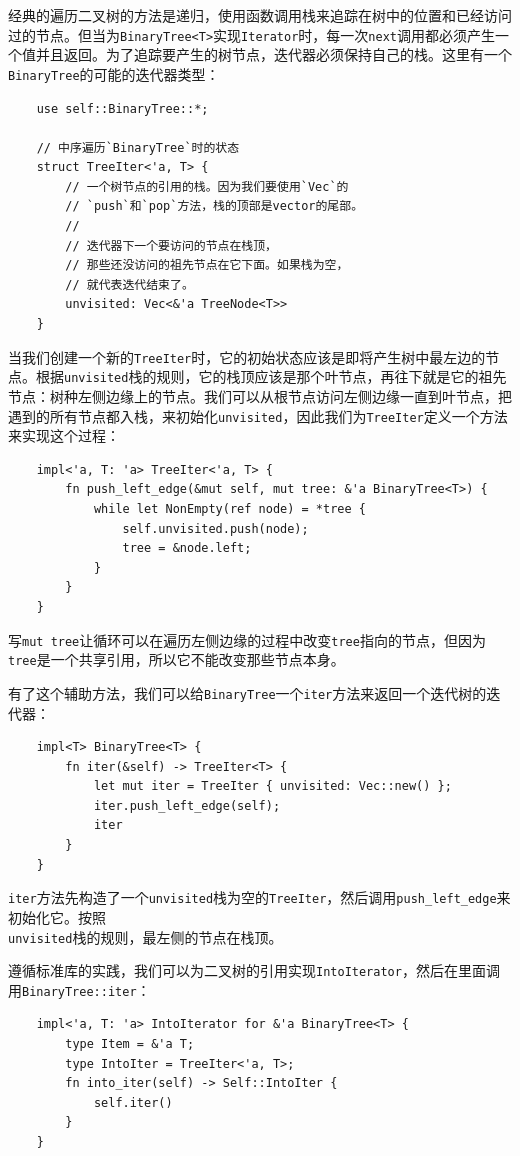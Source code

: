 经典的遍历二叉树的方法是递归，使用函数调用栈来追踪在树中的位置和已经访问过的节点。但当为\texttt{BinaryTree<T>}实现\texttt{Iterator}时，每一次\texttt{next}调用都必须产生一个值并且返回。为了追踪要产生的树节点，迭代器必须保持自己的栈。这里有一个\texttt{BinaryTree}的可能的迭代器类型：
\begin{verbatim}
    use self::BinaryTree::*;

    // 中序遍历`BinaryTree`时的状态
    struct TreeIter<'a, T> {
        // 一个树节点的引用的栈。因为我们要使用`Vec`的
        // `push`和`pop`方法，栈的顶部是vector的尾部。
        //
        // 迭代器下一个要访问的节点在栈顶，
        // 那些还没访问的祖先节点在它下面。如果栈为空，
        // 就代表迭代结束了。
        unvisited: Vec<&'a TreeNode<T>>
    }
\end{verbatim}

当我们创建一个新的\texttt{TreeIter}时，它的初始状态应该是即将产生树中最左边的节点。根据\texttt{unvisited}栈的规则，它的栈顶应该是那个叶节点，再往下就是它的祖先节点：树种左侧边缘上的节点。我们可以从根节点访问左侧边缘一直到叶节点，把遇到的所有节点都入栈，来初始化\texttt{unvisited}，因此我们为\texttt{TreeIter}定义一个方法来实现这个过程：
\begin{verbatim}
    impl<'a, T: 'a> TreeIter<'a, T> {
        fn push_left_edge(&mut self, mut tree: &'a BinaryTree<T>) {
            while let NonEmpty(ref node) = *tree {
                self.unvisited.push(node);
                tree = &node.left;
            }
        }
    }
\end{verbatim}

写\texttt{mut tree}让循环可以在遍历左侧边缘的过程中改变\texttt{tree}指向的节点，但因为\texttt{tree}是一个共享引用，所以它不能改变那些节点本身。

有了这个辅助方法，我们可以给\texttt{BinaryTree}一个\texttt{iter}方法来返回一个迭代树的迭代器：
\begin{verbatim}
    impl<T> BinaryTree<T> {
        fn iter(&self) -> TreeIter<T> {
            let mut iter = TreeIter { unvisited: Vec::new() };
            iter.push_left_edge(self);
            iter
        }
    }
\end{verbatim}

\texttt{iter}方法先构造了一个\texttt{unvisited}栈为空的\texttt{TreeIter}，然后调用\texttt{push\_left\_edge}来初始化它。按照\\
\texttt{unvisited}栈的规则，最左侧的节点在栈顶。

遵循标准库的实践，我们可以为二叉树的引用实现\texttt{IntoIterator}，然后在里面调用\texttt{BinaryTree::iter}：
\begin{verbatim}
    impl<'a, T: 'a> IntoIterator for &'a BinaryTree<T> {
        type Item = &'a T;
        type IntoIter = TreeIter<'a, T>;
        fn into_iter(self) -> Self::IntoIter {
            self.iter()
        }
    }
\end{verbatim}

